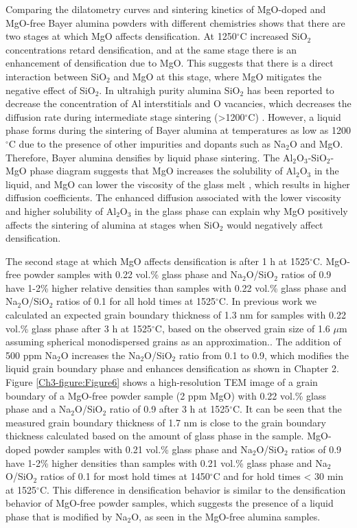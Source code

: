 Comparing the dilatometry curves and sintering kinetics of MgO-doped and MgO-free Bayer alumina powders with different chemistries shows that there are two stages at which MgO affects densification. At 1250$^{\circ}$C increased SiO$_{2}$ concentrations retard densification, and at the same stage there is an enhancement of densification due to MgO. This suggests that there is a direct interaction between SiO$_{2}$ and MgO at this stage, where MgO mitigates the negative effect of SiO$_{2}$. In ultrahigh purity alumina SiO$_{2}$ has been reported to decrease the concentration of Al interstitials and O vacancies, which decreases the diffusion rate during intermediate stage sintering (>1200$^{\circ}$C) \cite{Louet2008}. However, a liquid phase forms during the sintering of Bayer alumina at temperatures as low as 1200$^{\circ}$C due to the presence of other impurities and dopants such as Na$_{2}$O and MgO. Therefore, Bayer alumina densifies by liquid phase sintering. The Al$_{2}$O$_{3}$-SiO$_{2}$-MgO phase diagram suggests that MgO increases the solubility of Al$_{2}$O$_{3}$ in the liquid, and MgO can lower the viscosity of the glass melt \cite{Wu2015}, which results in higher diffusion coefficients. The enhanced diffusion associated with the lower viscosity and higher solubility of Al$_{2}$O$_{3}$ in the glass phase can explain why MgO positively affects the sintering of alumina at stages when SiO$_{2}$ would negatively affect densification. 

The second stage at which MgO affects densification is after 1 h at 1525$^{\circ}$C. MgO-free powder samples with 0.22 vol.\% glass phase and Na$_{2}$O/SiO$_{2}$ ratios of 0.9 have 1-2\% higher relative densities than samples with 0.22 vol.\% glass phase and Na$_{2}$O/SiO$_{2}$ ratios of 0.1 for all hold times at 1525$^{\circ}$C. In previous work we calculated an expected grain boundary thickness of 1.3 nm for samples with 0.22 vol.\% glass phase after 3 h at 1525$^{\circ}$C, based on the observed grain size of 1.6 $\mu$m assuming spherical monodispersed grains as an approximation.. The addition of 500 ppm Na$_{2}$O increases the Na$_{2}$O/SiO$_{2}$ ratio from 0.1 to 0.9, which modifies the liquid grain boundary phase and enhances densification as shown in Chapter 2. Figure \ref{Ch3-figure:Figure6} shows a high-resolution TEM image of a grain boundary of a MgO-free powder sample (2 ppm MgO) with 0.22 vol.\% glass phase and a Na$_{2}$O/SiO$_{2}$ ratio of 0.9 after 3 h at 1525$^{\circ}$C. It can be seen that the measured grain boundary thickness of 1.7 nm is close to the grain boundary thickness calculated based on the amount of glass phase in the sample. MgO-doped powder samples with 0.21 vol.\% glass phase and Na$_{2}$O/SiO$_{2}$ ratios of 0.9 have 1-2\% higher densities than samples with 0.21 vol.\% glass phase and Na$_{2}$O/SiO$_{2}$ ratios of 0.1 for most hold times at 1450$^{\circ}$C and for hold times < 30 min at 1525$^{\circ}$C. This difference in densification behavior is similar to the densification behavior of MgO-free powder samples, which suggests the presence of a liquid phase that is modified by Na$_{2}$O, as seen in the MgO-free alumina samples. 

